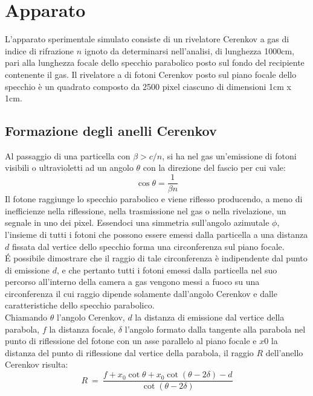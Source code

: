 \documentclass[8pt]{extarticle}
\begin{document}
\section{Apparato}
L'apparato sperimentale simulato consiste di un rivelatore Cerenkov a gas di indice di rifrazione $n$ ignoto da determinarsi nell'analisi, di lunghezza 1000cm, pari alla lunghezza focale dello specchio parabolico posto sul fondo del recipiente contenente il gas. Il rivelatore a di fotoni Cerenkov posto sul piano focale dello specchio è un quadrato composto da 2500 pixel ciascuno di dimensioni 1cm x 1cm. \\
\subsection{Formazione degli anelli Cerenkov}
Al passaggio di una particella con $\beta > c/n$, si ha nel gas un'emissione di fotoni visibili o ultravioletti ad un angolo $\theta$ con la direzione del fascio per cui vale:
\begin{equation} \label{eq:cerenkov}
\cos{\theta}=\frac{1}{\beta n}
\end{equation}
Il fotone raggiunge lo specchio parabolico e viene riflesso producendo, a meno di inefficienze nella riflessione, nella trasmissione nel gas o nella rivelazione, un segnale in uno dei pixel. Essendoci una simmetria sull'angolo azimutale $\phi$, l'insieme di tutti i fotoni che possono essere emessi dalla particella a una distanza $d$ fissata dal vertice dello specchio forma una circonferenza sul piano focale.\\
\'E possibile dimostrare che il raggio di tale circonferenza è indipendente dal punto di emissione $d$, e che pertanto tutti i fotoni emessi dalla particella nel suo percorso all'interno della camera a gas vengono messi a fuoco su una circonferenza il cui raggio dipende solamente dall'angolo Cerenkov e dalle caratteristiche dello specchio parabolico.\\
Chiamando $\theta$ l'angolo Cerenkov, $d$ la distanza di emissione dal vertice della parabola, $f$ la distanza focale, $\delta$ l'angolo formato dalla tangente alla parabola nel punto di riflessione del fotone con un asse parallelo al piano focale e $x0$ la distanza del punto di riflessione dal vertice della parabola, il raggio $R$ dell'anello Cerenkov risulta:
\begin{equation} \label{eq:raggio_theta}
R \ = \ \frac{f+x_0 \cot{\theta}+x_0 \cot{(\theta-2\delta)}-d}{\cot{(\theta-2\delta)}}
\end{equation}
\end{document}
